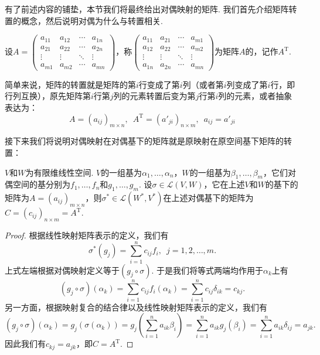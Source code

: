 有了前述内容的铺垫，本节我们将最终给出对偶映射的矩阵. 我们首先介绍矩阵转置的概念，然后说明对偶为什么与转置相关.
\begin{definition}[{\keyterm{转置}[transpose]}]
    设$A=\begin{pmatrix}
            a_{11} & a_{12} & \cdots & a_{1n} \\
            a_{21} & a_{22} & \cdots & a_{2n} \\
            \vdots & \vdots & \ddots & \vdots \\
            a_{m1} & a_{m2} & \cdots & a_{mn}
        \end{pmatrix}$，称$\begin{pmatrix}
            a_{11} & a_{21} & \cdots & a_{m1} \\
            a_{12} & a_{22} & \cdots & a_{m2} \\
            \vdots & \vdots & \ddots & \vdots \\
            a_{1n} & a_{2n} & \cdots & a_{mn}
        \end{pmatrix}$为矩阵$A$的，记作$A^\mathrm{T}$.
\end{definition}

简单来说，矩阵的转置就是矩阵的第$i$行变成了第$i$列（或者第$i$列变成了第$i$行，即行列互换），原先矩阵第$i$行第$j$列的元素转置后变为第$j$行第$i$列的元素，或者抽象表达为：
\[A=(a_{ij})_{m \times n},\enspace A^\mathrm{T}=(a'_{ji})_{n \times m},\enspace a_{ij}=a'_{ji}\]

接下来我们将说明对偶映射在对偶基下的矩阵就是原映射在原空间基下矩阵的转置：
\begin{theorem}
    $V$和$W$为有限维线性空间. $V$的一组基为$\alpha_1,\ldots,\alpha_n$，$W$的一组基为$\beta_1,\ldots,\beta_m$，它们对偶空间的基分别为$f_1,\ldots,f_n$和$g_1,\ldots,g_m$. 设$\sigma\in\mathcal{L}(V,W)$，它在上述$V$和$W$的基下的矩阵为$A=(a_{ij})_{m \times n}$，则$\sigma^*\in\mathcal{L}(W^*,V^*)$在上述对偶基下的矩阵为$C=(c_{ij})_{n \times m}=A^\mathrm{T}$.
\end{theorem}

\begin{proof}
    根据线性映射矩阵表示的定义，我们有
    \[\sigma^*(g_j)=\sum_{i=1}^nc_{ij}f_i,\enspace j=1,2,\ldots,m.\]
    上式左端根据对偶映射定义等于$(g_j\circ\sigma)$. 于是我们将等式两端均作用于$\alpha_k$上有
    \[(g_j\circ\sigma)(\alpha_k)=\sum_{i=1}^nc_{ij}f_i(\alpha_k)=\sum_{i=1}^nc_{ij}\delta_{ik}=c_{kj}.\]
    另一方面，根据映射复合的结合律以及线性映射矩阵表示的定义，我们有
    \[(g_j\circ\sigma)(\alpha_k)=g_j(\sigma(\alpha_k))=g_j\left(\sum_{i=1}^na_{ik}\beta_i\right)=\sum_{i=1}^na_{ik}g_j(\beta_i)=\sum_{i=1}^na_{ik}\delta_{ij}=a_{jk}.\]
    因此我们有$c_{kj}=a_{jk}$，即$C=A^\mathrm{T}$.
\end{proof}

